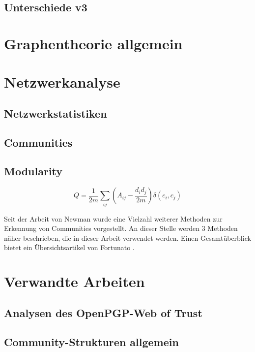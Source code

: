 \subsection{Unterschiede v3}
\label{ch:Grundlagen:sec:OpenPGP:subsec:v3Format}

\section{Graphentheorie allgemein}
\label{ch:Grundlagen:sec:Graphentheorie}

\section{Netzwerkanalyse}
\label{ch:Grundlagen:sec:Netzwerkanalyse}

\subsection{Netzwerkstatistiken}
\label{ch:Grundlagen:sec:Netzwerkanalyse:subsec:Statistiken}

\subsection{Communities}
\label{ch:Grundlagen:sec:Netzwerkanalyse:subsec:Communities}

\subsection{Modularity}
\label{sec:modularity}

\begin{equation}
  \label{eq:modularity}
  Q =
  \frac{1}{2m}\sum_{ij}\left(A_{ij}-\frac{d_id_j}{2m}\right)\delta(c_i, c_j)
\end{equation}

Seit der Arbeit von Newman wurde eine Vielzahl weiterer Methoden zur
Erkennung von Communities vorgestellt. An dieser Stelle werden 3
Methoden n\"aher beschrieben, die in dieser Arbeit verwendet
werden. Einen Gesamt\"uberblick bietet ein \"Ubersichtsartikel von
Fortunato \cite{Fortunato2010}.

\section{Verwandte Arbeiten}
\label{ch:Grundlagen:sec:RelatedWork}

\subsection{Analysen des OpenPGP-Web of Trust}
\label{ch:Grundlagen:sec:RelatedWork:subsec:wot-analysis}

\subsection{Community-Strukturen allgemein}
\label{ch:Grundlagen:sec:RelatedWork:subsec:community-analysis}
